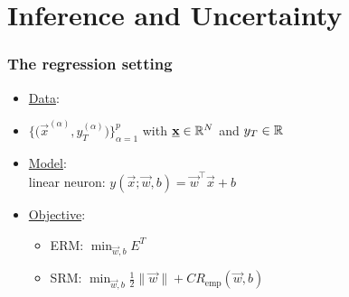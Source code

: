 \section{Inference and Uncertainty}


\begin{frame}\frametitle{The regression setting}


\begin{itemize}
\item[] \underline{Data}:\\

    \item[]$
    \big\{ \big(\vec x^{(\alpha)}, y_{T}^{(\alpha)}\big)\big\}_{\alpha=1}^{p}
    $ with $\underline{\mathbf{x}} \in \mathbb{R}^{N}$ and $y_{T} \in \mathbb{R}${}

\item[] \underline{Model}:\\
    linear neuron: $
        y(\vec x; \vec w, b) = \vec w^{\top} \vec x + b$
        
\item[] \underline{Objective}:\\
    \begin{itemize}
    \item ERM: $\min_{\vec w,b} E^{T}$
    \item SRM: $\min_{\vec w,b} \frac{1}{2} \lVert \vec w \rVert + C R_{\text{emp}}(\vec w,b)$
    \end{itemize}

    
\end{itemize}
\end{frame}


